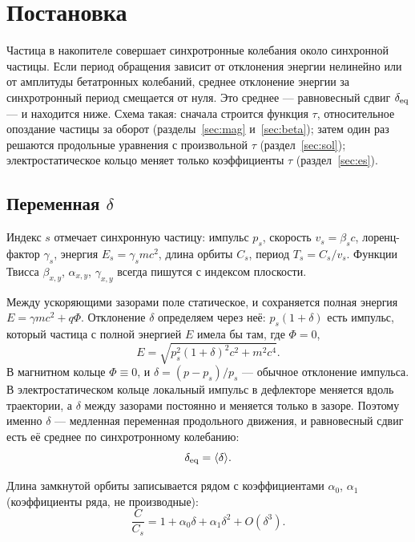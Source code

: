 \section{Постановка}
\label{sec:setup}

Частица в накопителе совершает синхротронные колебания около синхронной частицы. Если период обращения зависит от отклонения энергии нелинейно или от амплитуды бетатронных колебаний, среднее отклонение энергии за синхротронный период смещается от нуля. Это среднее --- равновесный сдвиг $\delta_{\mathrm{eq}}$ --- и находится ниже. Схема такая: сначала строится функция $\tau$, относительное опоздание частицы за оборот (разделы~\ref{sec:mag} и~\ref{sec:beta}); затем один раз решаются продольные уравнения с произвольной $\tau$ (раздел~\ref{sec:sol}); электростатическое кольцо меняет только коэффициенты $\tau$ (раздел~\ref{sec:es}).

\subsection{Переменная $\delta$}

Индекс $s$ отмечает синхронную частицу: импульс $p_s$, скорость $v_s=\beta_s c$, лоренц-фактор $\gamma_s$, энергия $E_s=\gamma_s mc^2$, длина орбиты $C_s$, период $T_s=C_s/v_s$. Функции Твисса $\beta_{x,y}$, $\alpha_{x,y}$, $\gamma_{x,y}$ всегда пишутся с индексом плоскости.

Между ускоряющими зазорами поле статическое, и сохраняется полная энергия $E=\gamma mc^2+q\Phi$. Отклонение $\delta$ определяем через неё: $p_s(1+\delta)$ есть импульс, который частица с полной энергией $E$ имела бы там, где $\Phi=0$,
\begin{equation}
\label{eq:set-delta}
E=\sqrt{p_s^2(1+\delta)^2c^2+m^2c^4}.
\end{equation}
В магнитном кольце $\Phi\equiv 0$, и $\delta=(p-p_s)/p_s$ --- обычное отклонение импульса. В электростатическом кольце локальный импульс в дефлекторе меняется вдоль траектории, а $\delta$ между зазорами постоянно и меняется только в зазоре. Поэтому именно $\delta$ --- медленная переменная продольного движения, и равновесный сдвиг есть её среднее по синхротронному колебанию:
\begin{equation}
\label{eq:set-deq}
\delta_{\mathrm{eq}}=\langle\delta\rangle.
\end{equation}

Длина замкнутой орбиты записывается рядом с коэффициентами $\alpha_0$, $\alpha_1$ (коэффициенты ряда, не производные):
\begin{equation}
\label{eq:set-C}
\frac{C}{C_s}=1+\alpha_0\delta+\alpha_1\delta^2+O(\delta^3).
\end{equation}

